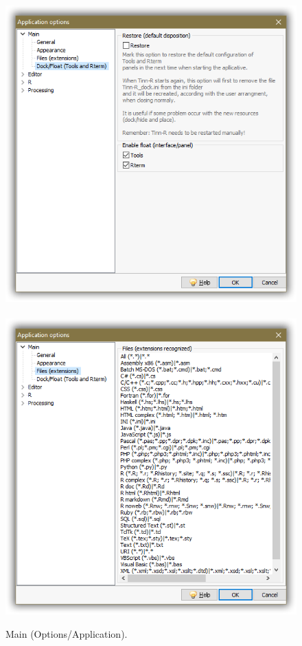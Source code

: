 \begin{figure}[H]
  \includegraphics[scale=0.35]{./res/app_main_dock.png}~~
  \includegraphics[scale=0.35]{./res/app_main_files.png}\\
  \caption{Main (Options/Application).}
  \label{fig:app_main_options}
\end{figure}

